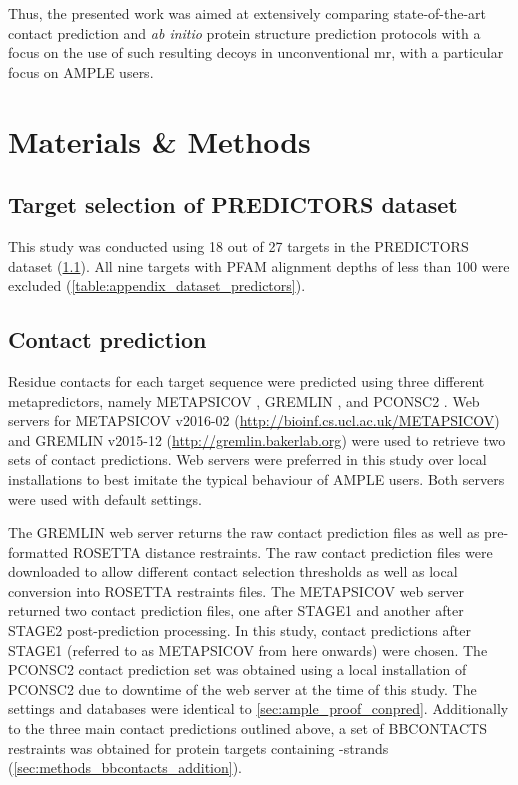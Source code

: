 Thus, the presented work was aimed at extensively comparing state-of-the-art contact prediction and \textit{ab initio} protein structure prediction protocols with a focus on the use of such resulting decoys in unconventional \gls{mr}, with a particular focus on AMPLE users.

\section{Materials \& Methods}
\subsection{Target selection of PREDICTORS dataset} \label{sec:methods_dataset_predictors}
This study was conducted using 18 out of 27 targets in the PREDICTORS dataset (\cref{sec:methods_dataset_predictors}). All nine targets with PFAM alignment depths of less than 100 were excluded (\cref{table:appendix_dataset_predictors}).

\subsection{Contact prediction}
Residue contacts for each target sequence were predicted using three different metapredictors, namely METAPSICOV \cite{Jones2015-vq}, GREMLIN \cite{Kamisetty2013-le}, and PCONSC2 \cite{Skwark2014-qp}. Web servers for METAPSICOV v2016-02 (\url{http://bioinf.cs.ucl.ac.uk/METAPSICOV}) and GREMLIN v2015-12 (\url{http://gremlin.bakerlab.org}) were used to retrieve two sets of contact predictions. Web servers were preferred in this study over local installations to best imitate the typical behaviour of AMPLE users. Both servers were used with default settings.

The GREMLIN web server returns the raw contact prediction files as well as pre-formatted ROSETTA distance restraints. The raw contact prediction files were downloaded to allow different contact selection thresholds as well as local conversion into ROSETTA restraints files. The METAPSICOV web server returned two contact prediction files, one after STAGE1 and another after STAGE2 post-prediction processing. In this study, contact predictions after STAGE1 (referred to as METAPSICOV from here onwards) were chosen. The PCONSC2 contact prediction set was obtained using a local installation of PCONSC2 due to downtime of the web server at the time of this study. The settings and databases were identical to \cref{sec:ample_proof_conpred}. Additionally to the three main contact predictions outlined above, a set of BBCONTACTS restraints was obtained for protein targets containing \textbeta-strands (\cref{sec:methods_bbcontacts_addition}).

